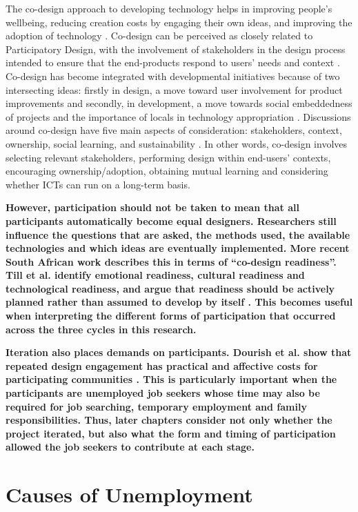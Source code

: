 The co-design approach to developing technology helps in improving people’s wellbeing, reducing creation costs by engaging their own ideas, and improving the adoption of technology \cite{steen2011}. Co-design can be perceived as closely related to Participatory Design, with the involvement of stakeholders in the design process intended to ensure that the end-products respond to users’ needs and context \cite{david2013}. Co-design has become integrated with developmental initiatives because of two intersecting ideas: firstly in design, a move toward user involvement for product improvements and secondly, in development, a move towards social embeddedness of projects and the importance of locals in technology appropriation \cite{david2013}. Discussions around co-design have five main aspects of consideration: stakeholders, context, ownership, social learning, and sustainability \cite{david2013}. In other words, co-design involves selecting relevant stakeholders, performing design within end-users’ contexts, encouraging ownership/adoption, obtaining mutual learning and considering whether ICTs can run on a long-term basis.

\textbf{However, participation should not be taken to mean that all participants automatically become equal designers. Researchers still influence the questions that are asked, the methods used, the available technologies and which ideas are eventually implemented. More recent South African work describes this in terms of “co-design readiness”. Till et al. identify emotional readiness, cultural readiness and technological readiness, and argue that readiness should be actively planned rather than assumed to develop by itself \cite{till2026}. This becomes useful when interpreting the different forms of participation that occurred across the three cycles in this research.}

\textbf{Iteration also places demands on participants. Dourish et al. show that repeated design engagement has practical and affective costs for participating communities \cite{dourish2020}. This is particularly important when the participants are unemployed job seekers whose time may also be required for job searching, temporary employment and family responsibilities. Thus, later chapters consider not only whether the project iterated, but also what the form and timing of participation allowed the job seekers to contribute at each stage.}

\section{Causes of Unemployment}

